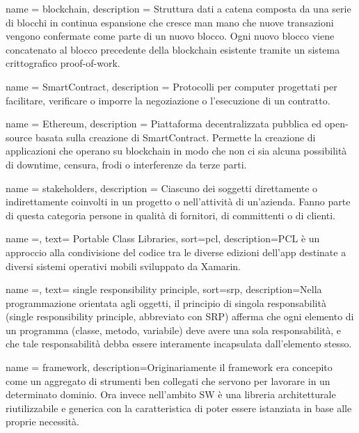 {
	name = {blockchain},
	description = { Struttura dati a catena composta da una serie di blocchi in continua espansione che cresce man mano che nuove
			transazioni vengono confermate come parte di un nuovo blocco. Ogni nuovo blocco viene concatenato al blocco
			precedente della blockchain esistente tramite un sistema crittografico proof-of-work.
		}
}

{
	name = {SmartContract},
	description = { Protocolli per computer progettati per facilitare, verificare o imporre la negoziazione o l'esecuzione di un
			contratto.
		}
}

{
	name = {Ethereum},
	description = { Piattaforma decentralizzata pubblica ed open-source basata sulla creazione di
			SmartContract. Permette la creazione di applicazioni che operano su blockchain
			in modo che non ci sia alcuna possibilità di downtime, censura, frodi o interferenze
			da terze parti.
		}
}

{
	name = {stakeholders},
	description = { Ciascuno dei soggetti direttamente o indirettamente coinvolti in un progetto o nell'attività di un'azienda.
			Fanno parte di questa categoria persone in qualità di fornitori, di committenti o di clienti.
		}
}



{
    name =,
    text= {Portable Class Libraries},
    sort=pcl,
    description={PCL è un approccio alla condivisione del codice tra le diverse edizioni dell’app destinate a diversi sistemi operativi mobili sviluppato da Xamarin.}
}


{
    name =,
    text= {single responsibility principle},
    sort=srp,
    description={Nella programmazione orientata agli oggetti, il principio di singola responsabilità (single responsibility principle, abbreviato con SRP) afferma che ogni elemento di un programma (classe, metodo, variabile) deve avere una sola responsabilità, e che tale responsabilità debba essere interamente incapsulata dall'elemento stesso.}
}


{
    name = {framework},
    description={Originariamente il framework era concepito come un aggregato di strumenti ben collegati che servono per lavorare in un determinato dominio. Ora invece nell’ambito SW è una libreria architetturale riutilizzabile e generica con la caratteristica di poter essere istanziata in base alle proprie necessità. }
}

